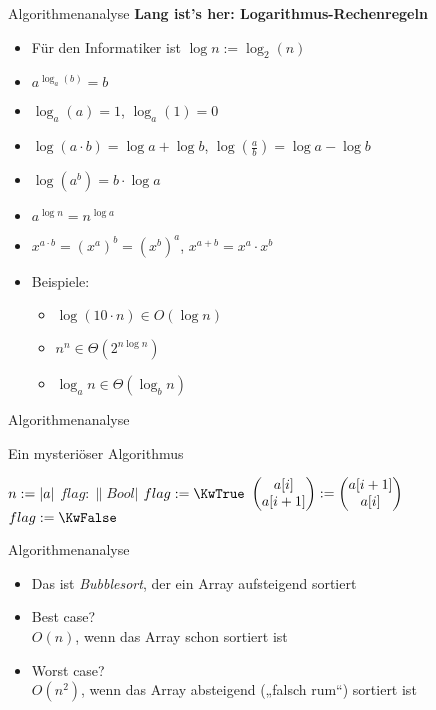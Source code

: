 \begin{frame}{Algorithmenanalyse}
	\textbf{Lang ist's her: Logarithmus-Rechenregeln} \\[0,125cm]
	\begin{itemize}[<+->]
		\item Für den Informatiker ist $\log n := \log_2(n)$
		\item $a^{\log_a(b)} = b$
		\item $\log_a(a) =1$, \quad $\log_a(1) = 0$
		\item $\log(a \cdot b) = \log a + \log b$, \quad $\log(\frac{a}{b}) = \log a - \log b$
		\item $\log(a^b) = b \cdot \log a$
		\item $a^{\log n} = n^{\log a}$
		\item $x^{a \cdot b} = \left(x^a\right)^b = \left(x^b\right)^a$, \quad $x^{a + b} = x^a \cdot x^b$
		\item Beispiele:
		\begin{itemize}
			\item $\log(10 \cdot n) \in O(\log n)$
			\item $n^n \in \Theta(2^{n \log n})$
			\item $\log_a n \in \Theta(\log_b n) $
		\end{itemize}
	\end{itemize}
\end{frame}

\begin{frame}{Algorithmenanalyse}
	\begin{exampleblock}{Ein mysteriöser Algorithmus}
		\begin{algorithm}[H]
			 {
				$n := \left\lvert a \right\rvert$\;
				$flag : \|Bool|$\;
				 {
					$flag := \KwTrue$\;
					 {
						 {
							$\begin{pmatrix} a[i] \\ a[i+1] \end{pmatrix} := \begin{pmatrix} a[i+1] \\ a[i] \end{pmatrix}$ \; 
							$flag := \KwFalse$\;
						}
					}
				}
			}
		\end{algorithm}
	\end{exampleblock}
\end{frame}


\begin{frame}{Algorithmenanalyse}
	\begin{itemize}
		\item Das ist \textit{Bubblesort}, der ein Array aufsteigend sortiert
		\pause
		\item Best case?
		\pause
		\\ \impl $O(n)$, wenn das Array schon sortiert ist
		\pause
		\item Worst case?
		\pause
		\\ \impl $O(n^2)$, wenn das Array absteigend („falsch rum“) sortiert ist
	\end{itemize}
\end{frame}

